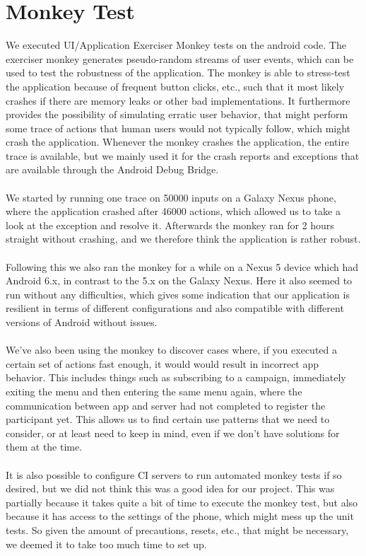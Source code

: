 \section{Monkey Test}
\label{sec:monkey_test}
We executed UI/Application Exerciser Monkey tests on the android code. The exerciser monkey generates pseudo-random streams of user events, which can be used to test the robustness of the application. The monkey is able to stress-test the application because of frequent button clicks, etc., such that it most likely crashes if there are memory leaks or other bad implementations. It furthermore provides the possibility of simulating erratic user behavior, that might perform some trace of actions that human users would not typically follow, which might crash the application. Whenever the monkey crashes the application, the entire trace is available, but we mainly used it for the crash reports and exceptions that are available through the Android Debug Bridge. 
\\\\
We started by running one trace on 50000 inputs on a Galaxy Nexus phone, where the application crashed after 46000 actions, which allowed us to take a look at the exception and resolve it. Afterwards the monkey ran for 2 hours straight without crashing, and we therefore think the application is rather robust.
\\\\
Following this we also ran the monkey for a while on a Nexus 5 device which had Android 6.x, in contrast to the 5.x on the Galaxy Nexus. Here it also seemed to run without any difficulties, which gives some indication that our application is resilient in terms of different configurations and also compatible with different versions of Android without issues.
\\\\
We've also been using the monkey to discover cases where, if you executed a certain set of actions fast enough, it would would result in incorrect app behavior. This includes things such as subscribing to a campaign, immediately exiting the menu and then entering the same menu again, where the communication between app and server had not completed to register the participant yet. This allows us to find certain use patterns that we need to consider, or at least need to keep in mind, even if we don't have solutions for them at the time.
\\\\
It is also possible to configure CI servers to run automated monkey tests if so desired, but we did not think this was a good idea for our project. This was partially because it takes quite a bit of time to execute the monkey test, but also because it has access to the settings of the phone, which might mess up the unit tests. So given the amount of precautions, resets, etc., that might be necessary, we deemed it to take too much time to set up. 

